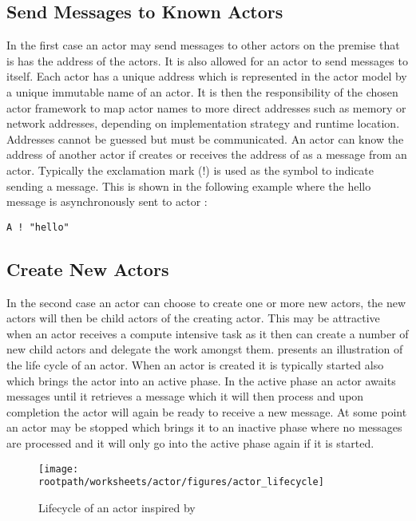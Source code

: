 \subsection{Send Messages to Known Actors}
In the first case an actor may send messages to other actors on the premise that is has the address of the actors. It is also allowed for an actor to send messages to itself. Each actor has a unique address which is represented in the actor model by a unique immutable name of an actor\cite[p. 2]{karmani2009actor}. It is then the responsibility of the chosen actor framework to map actor names to more direct addresses such as memory or network addresses, depending on implementation strategy and runtime location\cite[p. 3]{hewitt2014actor}. Addresses cannot be guessed but must be communicated. An actor  can know the address of another actor  if  creates  or receives the address of  as a message from an actor. Typically the exclamation mark (!) is used as the symbol to indicate sending a message. This is shown in the following example where the hello message is asynchronously sent to actor :
\begin{verbatim}
A ! "hello"
\end{verbatim}

\subsection{Create New Actors}
In the second case an actor can choose to create one or more new actors, the new actors will then be child actors of the creating actor. This may be attractive when an actor receives a compute intensive task as it then can create a number of new child actors and delegate the work amongst them.  presents an illustration of the life cycle of an actor. When an actor is created it is typically started also which brings the actor into an active phase. In the active phase an actor awaits messages until it retrieves a message which it will then process and upon completion the actor will again be ready to receive a new message. At some point an actor may be stopped which brings it to an inactive phase where no messages are processed and it will only go into the active phase again if it is started.

\begin{figure}[ht!]
\centering
\texttt{[image: \\rootpath/worksheets/actor/figures/actor\_lifecycle]}
\caption{Lifecycle of an actor inspired by \cite[Figure 12]{subramaniam2011programming}}\label{fig:actor_lifecycle}
\end{figure}
